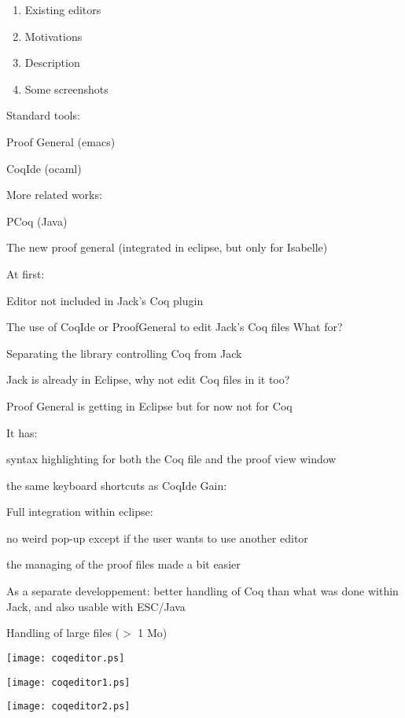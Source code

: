 \begin{enumerate}
  \item Existing editors
  \item Motivations
  \item Description
  \item Some screenshots

\end{enumerate}


\blist 
\item Standard tools:
  \blist \small
     \item Proof General (emacs)
     \item CoqIde (ocaml)
  \elist
\item More related works:
  \blist \small
     \item PCoq (Java)
     \item The new proof general (integrated in eclipse, but only for Isabelle)
  \elist
\elist

\small
At first:
\blist
\item Editor not included in Jack's Coq plugin
\item The use of {\purple CoqIde} or {\purple ProofGeneral} to edit Jack's Coq files
\elist
What for?
\blist
  \item Separating the {\purple library controlling Coq} from Jack
  \item Jack is already in Eclipse, why not edit Coq files in it too?
  \item Proof General is getting in Eclipse but for now not for Coq
\elist



\small
It has:
\blist 
\item {\purple syntax highlighting}
 for both the Coq file and the proof view window
\item the same keyboard shortcuts as CoqIde
\elist
Gain:
\blist
\item Full integration within eclipse: 
  \blist 
  \item no weird pop-up except if the user wants to use another editor
  \item the managing of the proof files made a bit easier
  \elist
  
\item As a separate developpement: better handling of Coq than 
  what was done within Jack, and also usable with ESC/Java
\item Handling of {\purple large} files ($>$ 1 Mo)
\elist

\begin{center}
\texttt{[image: coqeditor.ps]}
\end{center}

\begin{center}
\texttt{[image: coqeditor1.ps]}
\end{center}
\begin{center}
\texttt{[image: coqeditor2.ps]}
\end{center}